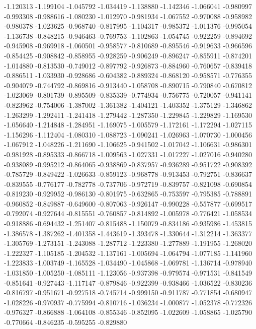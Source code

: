 -1.120313
-1.199104
-1.045792
-1.034419
-1.138880
-1.142346
-1.066041
-0.980997
-0.993308
-0.988616
-1.080230
-1.012970
-0.981934
-1.067552
-0.970088
-0.958982
-0.980378
-1.023625
-0.968740
-0.817995
-1.104317
-0.985372
-1.011376
-0.995054
-1.136738
-0.848215
-0.946463
-0.769753
-1.102863
-1.054745
-0.922259
-0.894692
-0.945908
-0.969918
-1.060501
-0.958577
-0.810689
-0.895546
-0.919633
-0.966596
-0.854425
-0.908842
-0.858955
-0.928259
-0.906249
-0.896247
-0.855911
-0.874201
-1.014880
-0.813530
-0.749012
-0.897792
-0.926873
-0.884960
-0.760657
-0.839418
-0.886511
-1.033930
-0.928686
-0.604382
-0.889324
-0.868120
-0.958571
-0.776355
-0.904079
-0.744792
-0.869816
-0.913440
-1.058708
-0.890715
-0.790840
-0.670812
-1.023069
-0.801739
-0.895509
-0.835339
-0.774934
-0.756775
-0.720057
-0.941141
-0.823962
-0.754006
-1.387002
-1.361382
-1.404121
-1.403352
-1.375129
-1.346862
-1.263299
-1.292411
-1.241418
-1.279442
-1.287350
-1.229845
-1.229829
-1.169530
-1.056640
-1.214848
-1.284951
-1.169075
-1.005579
-1.172161
-1.172294
-1.027115
-1.156296
-1.112404
-1.080310
-1.088723
-1.090241
-1.026963
-1.070730
-1.000456
-1.067912
-1.048226
-1.211690
-1.106625
-0.941502
-1.017042
-1.106631
-0.986301
-0.981928
-0.895333
-0.866718
-1.009563
-1.027331
-1.017227
-1.027016
-0.940280
-0.938089
-0.995212
-0.864065
-0.938869
-0.837957
-0.936289
-0.951722
-0.908392
-0.785729
-0.849422
-1.026633
-0.859123
-0.968778
-0.913453
-0.792751
-0.836637
-0.839555
-0.776177
-0.782778
-0.737706
-0.972719
-0.839757
-0.821098
-0.690854
-0.819230
-0.929952
-0.986130
-0.801975
-0.632865
-0.753597
-0.795385
-0.788891
-0.960852
-0.849887
-0.649600
-0.807063
-0.926147
-0.990228
-0.557877
-0.699517
-0.792074
-0.927644
-0.815551
-0.760857
-0.814892
-1.005978
-0.776421
-1.058534
-0.918886
-0.694432
-1.251407
-0.815488
-1.150079
-0.834186
-0.935986
-1.453815
-1.386578
-1.387262
-1.401358
-1.443619
-1.393478
-1.330644
-1.312214
-1.363377
-1.305769
-1.273151
-1.243088
-1.287712
-1.223380
-1.277889
-1.191955
-1.268020
-1.222327
-1.105185
-1.204532
-1.137161
-1.005694
-1.064794
-1.077185
-1.141960
-1.223833
-1.003749
-1.165528
-1.034490
-1.045868
-1.069781
-1.136714
-0.978940
-1.031850
-1.005250
-1.085111
-1.123056
-0.937398
-0.979574
-0.971531
-0.841549
-0.851641
-0.927443
-1.117147
-0.879846
-0.922399
-0.938466
-1.036522
-0.830236
-0.816797
-0.951671
-0.927518
-0.745714
-0.999150
-0.911787
-0.771854
-0.680947
-1.028226
-0.970937
-0.775994
-0.810716
-1.036234
-1.000877
-1.052378
-0.772326
-0.976327
-0.866888
-1.064108
-0.855346
-0.852095
-1.022609
-1.058865
-1.025790
-0.770664
-0.846235
-0.595255
-0.829880
